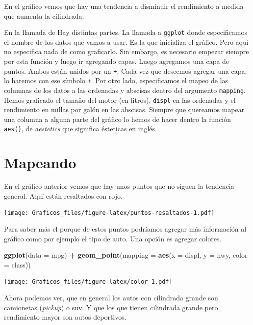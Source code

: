 \documentclass[]{book}
\newenvironment{Shaded}{\begin{snugshade}}{\end{snugshade}}
\newcommand{\DataTypeTok}[1]{\textcolor[rgb]{0.13,0.29,0.53}{#1}}
\newcommand{\KeywordTok}[1]{\textcolor[rgb]{0.13,0.29,0.53}{\textbf{#1}}}
\newcommand{\NormalTok}[1]{#1}
\newcommand{\OperatorTok}[1]{\textcolor[rgb]{0.81,0.36,0.00}{\textbf{#1}}}
\newcommand{\StringTok}[1]{\textcolor[rgb]{0.31,0.60,0.02}{#1}}
\theoremstyle{definition}
\theoremstyle{definition}
\theoremstyle{definition}
\theoremstyle{remark}
\begin{document}
En el gráfico vemos que hay una tendencia a disminuir el rendimiento a
medida que aumenta la cilindrada.

En la llamada de Hay distintas partes. La llamada a \texttt{ggplot}
donde especificamos el nombre de los datos que vamos a usar. Es la que
inicializa el gráfico. Pero aquí no especifica nada de como graficarlo.
Sin embargo, es necesario empezar siempre por esta función y luego ir
agregando capas. Luego agregamos una capa de puntos. Ambos están unidos
por un \texttt{+}. Cada vez que deseemos agregar una capa, lo haremos
con ese símbolo \texttt{+}. Por otro lado, especificamos el mapeo de las
columnas de los datos a las ordenadas y abscisas dentro del argumento
\texttt{mapping}. Hemos graficado el tamaño del motor (en litros),
\texttt{displ} en las ordenadas y el rendimiento en millas por galón en
las abscisas. Siempre que quereamos mapear una columna a alguna parte
del gráfico lo hemos de hacer dentro la función \texttt{aes()}, de
\emph{aestetics} que significa ésteticas en inglés.

\hypertarget{mapeando}{%
\section{Mapeando}\label{mapeando}}

En el gráfico anterior vemos que hay unos puntos que no siguen la
tendencia general. Aquí están resaltados con rojo.

\texttt{[image: Graficos\_files/figure-latex/puntos-resaltados-1.pdf]}

Para saber más el porque de estos puntos podríamos agregar más
información al gráfico como por ejemplo el tipo de auto. Una opción es
agregar colores.

\begin{Shaded}
\begin{Highlighting}[]
\KeywordTok{ggplot}\NormalTok{(}\DataTypeTok{data =}\NormalTok{ mpg) }\OperatorTok{+}
\StringTok{ }\KeywordTok{geom_point}\NormalTok{(}\DataTypeTok{mapping =} \KeywordTok{aes}\NormalTok{(}\DataTypeTok{x =}\NormalTok{ displ, }\DataTypeTok{y =}\NormalTok{ hwy, }\DataTypeTok{color =}\NormalTok{ class))}
\end{Highlighting}
\end{Shaded}

\texttt{[image: Graficos\_files/figure-latex/color-1.pdf]}

Ahora podemos ver, que en general los autos con cilindrada grande son
camionetas (\emph{pickup}) o suv. Y que los que tienen cilindrada grande
pero rendimiento mayor son autos deportivos.
\end{document}
